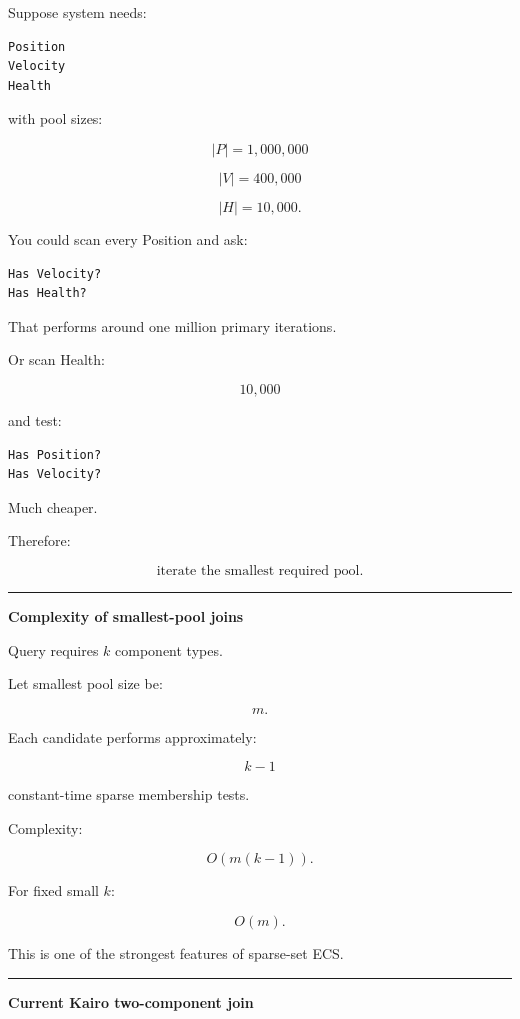 Suppose system needs:

\begin{verbatim}
Position
Velocity
Health
\end{verbatim}

with pool sizes:

\[
|P|=1,000,000
\]

\[
|V|=400,000
\]

\[
|H|=10,000.
\]

You could scan every Position and ask:

\begin{verbatim}
Has Velocity?
Has Health?
\end{verbatim}

That performs around one million primary iterations.

Or scan Health:

\[
10,000
\]

and test:

\begin{verbatim}
Has Position?
Has Velocity?
\end{verbatim}

Much cheaper.

Therefore:

\[
\boxed{
\text{iterate the smallest required pool}.
}
\]

\begin{center}\rule{0.5\linewidth}{0.5pt}\end{center}

\textbf{Complexity of smallest-pool joins}

Query requires \(k\) component types.

Let smallest pool size be:

\[
m.
\]

Each candidate performs approximately:

\[
k-1
\]

constant-time sparse membership tests.

Complexity:

\[
\boxed{
O(m(k-1)).
}
\]

For fixed small \(k\):

\[
O(m).
\]

This is one of the strongest features of sparse-set ECS.

\begin{center}\rule{0.5\linewidth}{0.5pt}\end{center}

\textbf{Current Kairo two-component join}

